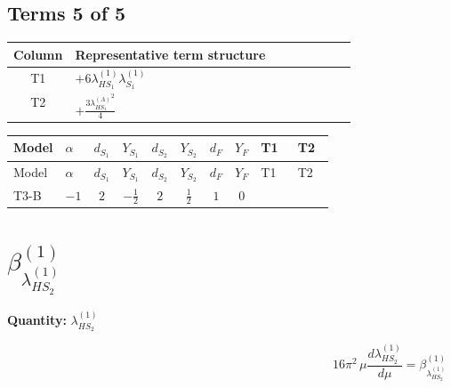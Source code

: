\documentclass[8pt]{article}
\begin{document}
\begin{landscape}
\subsection*{Terms 5 of 5}
\begin{center}
\begin{tabular}{@{}c >{\raggedright\arraybackslash}p{0.82\linewidth}@{}}
\toprule
Column & Representative term structure \\
\midrule
T1 & \(\displaystyle +6 {\lambda_{HS_1}^{(1)}} {\lambda_{S_1}^{(1)}}\) \\
\midrule
T2 & \(\displaystyle +\frac{3 {\lambda_{HS_1}^{(A)}}^2}{4}\) \\
\midrule
\bottomrule
\end{tabular}
\end{center}
\smallskip
\tiny
\begin{longtable}{@{}llcccccc >{\raggedright\arraybackslash}p{0.21\linewidth} >{\raggedright\arraybackslash}p{0.21\linewidth}@{}}
\toprule
Model & $\alpha$ & $d_{S_1}$ & $Y_{S_1}$ & $d_{S_2}$ & $Y_{S_2}$ & $d_F$ & $Y_F$ & T1 & T2 \\
\midrule
\endfirsthead
\toprule
Model & $\alpha$ & $d_{S_1}$ & $Y_{S_1}$ & $d_{S_2}$ & $Y_{S_2}$ & $d_F$ & $Y_F$ & T1 & T2 \\
\midrule
\endhead
T3-B & $-1$ & $2$ & $-\frac{1}{2}$ & $2$ & $\frac{1}{2}$ & $1$ & $0$ & \scriptsize\adjustbox{max width=\linewidth}{$\begin{gathered} +6 {\lambda_{HS_1}^{(1)}} {\lambda_{S_1}^{(1)}}\end{gathered}$} & \scriptsize\adjustbox{max width=\linewidth}{$\begin{gathered} +\frac{3 {\lambda_{HS_1}^{(A)}}^2}{4}\end{gathered}$} \\
\midrule
\bottomrule
\end{longtable}
\clearpage
\section*{$\beta_{\lambda_{HS_2}^{(1)}}^{(1)}$}
\noindent\textbf{Quantity: }$\lambda_{HS_2}^{(1)}$\par\smallskip
\[16\pi^2\,\mu\frac{d \lambda_{HS_2}^{(1)}}{d\mu}=\beta_{\lambda_{HS_2}^{(1)}}^{(1)}\]

\end{landscape}
\end{document}
